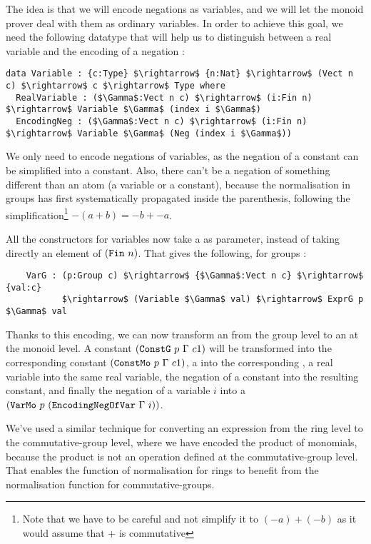 The idea is that we will encode negations as variables, and we will let the monoid prover deal with them as ordinary variables. In order to achieve this goal, we need the following datatype that will help us to distinguish between a real variable and the encoding of a negation :

\begin{lstlisting}
data Variable : {c:Type} $\rightarrow$ {n:Nat} $\rightarrow$ (Vect n c) $\rightarrow$ c $\rightarrow$ Type where
  RealVariable : ($\Gamma$:Vect n c) $\rightarrow$ (i:Fin n) $\rightarrow$ Variable $\Gamma$ (index i $\Gamma$)
  EncodingNeg : ($\Gamma$:Vect n c) $\rightarrow$ (i:Fin n) $\rightarrow$ Variable $\Gamma$ (Neg (index i $\Gamma$))
\end{lstlisting}

We only need to encode negations of variables, as the negation of a constant can be simplified into a constant. Also, there can't be a negation of something different than an atom (a variable or a constant), because the normalisation in groups has first systematically propagated  inside the parenthesis, following the simplification\footnote{Note that we have to be careful and not simplify it to $(-a) + (-b)$ as it would assume that $+$ is commutative} $-(a+b) = -b + -a$.

All the constructors for variables now take a  as parameter, instead of taking directly an element of $(\code{Fin}\ n)$. That gives the following, for groups :

\begin{lstlisting}
    VarG : (p:Group c) $\rightarrow$ {$\Gamma$:Vect n c} $\rightarrow$ {val:c} 
           $\rightarrow$ (Variable $\Gamma$ val) $\rightarrow$ ExprG p $\Gamma$ val
\end{lstlisting}


Thanks to this encoding, we can now transform an  from the group level to an  at the monoid level. A constant $({\mbox{\texttt{ConstG}}}\ p\ \Gamma\ c1)$ will be transformed into the corresponding constant $({\mbox{\texttt{ConstMo}}}\ p\ \Gamma\ c1)$, a  into the corresponding , a real variable into the same real variable, the negation of a constant into the resulting constant, and finally the negation of a variable $i$ into a $(\code{VarMo}\ p\ (\code{EncodingNegOfVar}\ \Gamma\ i))$.

We've used a similar technique for converting an expression from the ring level to the commutative-group level, where we have encoded the product of monomials, because the product is not an operation defined at the commutative-group level. That enables the function of normalisation for rings to benefit from the normalisation function for commutative-groups.


